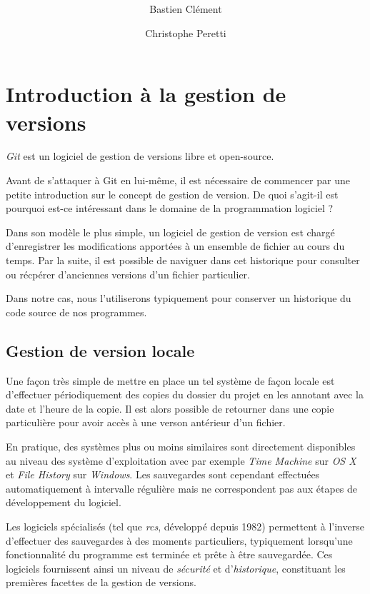 \documentclass[11pt,a4paper]{article}
\author{Bastien Clément \and Christophe Peretti}
\title{{\normalsize \doccourse} \\ \doctitle }
\begin{document}
\maketitle
\vspace{3em}

\tableofcontents

\section{Introduction à la gestion de versions}

\textit{Git} est un logiciel de gestion de versions libre et open-source.

Avant de s'attaquer à Git en lui-même, il est nécessaire de commencer par une petite introduction sur le concept de gestion de version. De quoi s'agit-il est pourquoi est-ce intéressant dans le domaine de la programmation logiciel ?

Dans son modèle le plus simple, un logiciel de gestion de version est chargé d'enregistrer les modifications apportées à un ensemble de fichier au cours du temps. Par la suite, il est possible de naviguer dans cet historique pour consulter ou récpérer d'anciennes versions d'un fichier particulier.

Dans notre cas, nous l'utiliserons typiquement pour conserver un historique du code source de nos programmes.

\subsection{Gestion de version locale}

Une façon très simple de mettre en place un tel système de façon locale est d'effectuer périodiquement des copies du dossier du projet en les annotant avec la date et l'heure de la copie. Il est alors possible de retourner dans une copie particulière pour avoir accès à une verson antérieur d'un fichier.

En pratique, des systèmes plus ou moins similaires sont directement disponibles au niveau des système d'exploitation avec par exemple \textit{Time Machine} sur \textit{OS X} et \textit{File History} sur \textit{Windows}. Les sauvegardes sont cependant effectuées automatiquement à intervalle régulière mais ne correspondent pas aux étapes de développement du logiciel.

Les logiciels spécialisés (tel que \textit{rcs}, développé depuis 1982) permettent à l'inverse d'effectuer des sauvegardes à des moments particuliers, typiquement lorsqu'une fonctionnalité du programme est terminée et prête à être sauvegardée. Ces logiciels fournissent ainsi un niveau de \textit{sécurité} et d'\textit{historique}, constituant les premières facettes de la gestion de versions.
\end{document}
